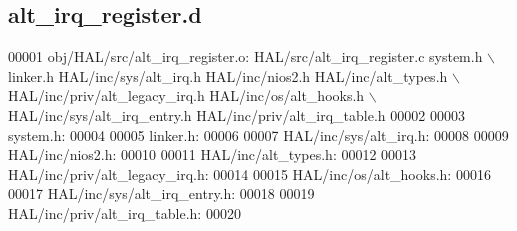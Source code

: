 \subsection{alt\+\_\+irq\+\_\+register.\+d}
\label{alt__irq__register_8d_source}

\begin{DoxyCode}
00001 obj/HAL/src/alt_irq_register.o: HAL/src/alt_irq_register.c system.h \(\backslash\)
 linker.h HAL/inc/sys/alt_irq.h HAL/inc/nios2.h HAL/inc/alt\_types.h \(\backslash\)
 HAL/inc/priv/alt\_legacy\_irq.h HAL/inc/os/alt\_hooks.h \(\backslash\)
 HAL/inc/sys/alt\_irq\_entry.h HAL/inc/priv/alt\_irq\_table.h
00002 
00003 system.h:
00004 
00005 linker.h:
00006 
00007 HAL/inc/sys/alt_irq.h:
00008 
00009 HAL/inc/nios2.h:
00010 
00011 HAL/inc/alt\_types.h:
00012 
00013 HAL/inc/priv/alt\_legacy\_irq.h:
00014 
00015 HAL/inc/os/alt\_hooks.h:
00016 
00017 HAL/inc/sys/alt\_irq\_entry.h:
00018 
00019 HAL/inc/priv/alt\_irq\_table.h:
00020 \end{DoxyCode}
